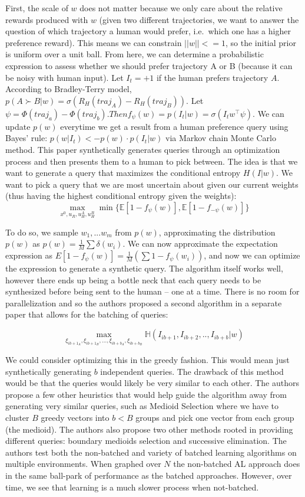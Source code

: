 \documentclass[
  letterpaper,
  numbers=noenddot,
  DIV=11]{scrreprt}
\theoremstyle{plain}
\theoremstyle{definition}
\theoremstyle{remark}
\begin{document}
First, the scale of \(w\) does not matter because we only care about the
relative rewards produced with \(w\) (given two different trajectories,
we want to answer the question of which trajectory a human would prefer,
i.e.~which one has a higher preference reward). This means we can
constrain \(||w|| <= 1\), so the initial prior is uniform over a unit
ball. From here, we can determine a probabilistic expression to assess
whether we should prefer trajectory A or B (because it can be noisy with
human input). Let \(I_t = +1\) if the human prefers trajectory \(A\).
According to Bradley-Terry model,
\(p(A \succ B|w) = \sigma(R_H(traj_A) - R_H(traj_B))\). Let
\(\psi = \Phi(traj_a) - \Phi(traj_b). Then f_{\psi} (w) = p(I_t|w) = \sigma(I_t w^{\intercal}\psi)\).
We can update \(p(w)\) everytime we get a result from a human preference
query using Bayes' rule: \(p(w|I_t) <- p(w) \cdot p(I_t|w)\) via Markov
chain Monte Carlo method. This paper synthetically generates queries
through an optimization process and then presents them to a human to
pick between. The idea is that we want to generate a query that
maximizes the conditional entropy \(H(I|w)\). We want to pick a query
that we are most uncertain about given our current weights (thus having
the highest conditional entropy given the weights):
\[\max_{x^0, u_R, u_H^A, u_H^B} \min\{\mathbb{E}[1-f_{\psi}(w)], \mathbb{E}[1 - f_{-\psi}(w)]\}\]

To do so, we sample \(w_1, ... w_m\) from \(p(w)\), approximating the
distribution \(p(w)\) as \(p(w) = \frac{1}{M} \sum \delta (w_i).\) We
can now approximate the expectation expression as
\(E[1 - f_{\psi}(w)] = \frac{1}{M} (\sum 1 - f_{\psi}(w_i))\), and now
we can optimize the expression to generate a synthetic query. The
algorithm itself works well, however there ends up being a bottle neck
that each query needs to be synthesized before being sent to the human
-- one at a time. There is no room for parallelization and so the
authors proposed a second algorithm in a separate paper that allows for
the batching of queries:

\[\max_{\xi_{ib+1_A}, \xi_{ib+1_B}, ... , \xi_{ib+b_A}, \xi_{ib+b_B}} \mathbb{H}(I_{ib+1}, I_{ib+2}, .., I_{ib+b} | w)\]

We could consider optimizing this in the greedy fashion. This would mean
just synthetically generating \(b\) independent queries. The drawback of
this method would be that the queries would likely be very similar to
each other. The authors propose a few other heuristics that would help
guide the algorithm away from generating very similar queries, such as
Medioid Selection where we have to cluster \(B\) greedy vectors into
\(b < B\) groups and pick one vector from each group (the medioid). The
authors also propose two other methods rooted in providing different
queries: boundary medioids selection and successive elimination. The
authors test both the non-batched and variety of batched learning
algorithms on multiple environments. When graphed over \(N\) the
non-batched AL approach does in the same ball-park of performance as the
batched approaches. However, over time, we see that learning is a much
slower process when not-batched.
\end{document}
